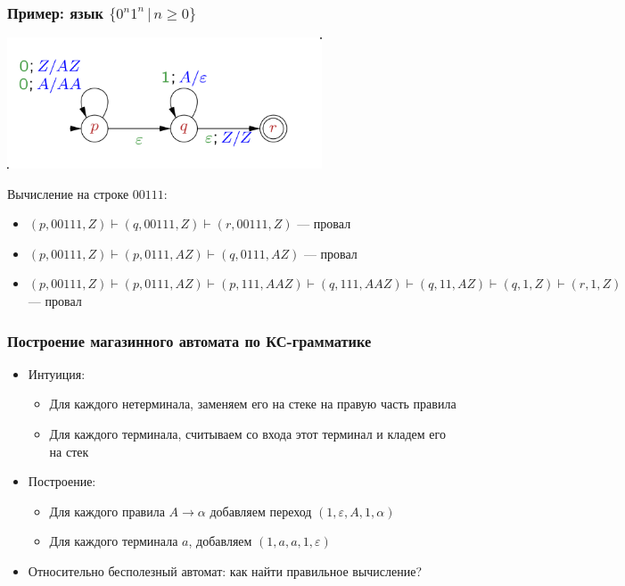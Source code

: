 \documentclass{beamer}
\begin{document}
\begin{frame}[fragile]
  \transwipe[direction=90]
  \frametitle{Пример: язык $\{ 0^n 1^n \, | \, n \geq 0 \}$}
\begin{center}
  \includegraphics[width=0.7\textwidth]{pics/Pda-example.png}
\end{center}

Вычисление на строке $00111$:
\begin{itemize}
  \item $(p, 00111, Z) \vdash (q, 00111, Z) \vdash (r, 00111, Z)$ --- провал
  \item $(p, 00111, Z) \vdash (p, 0111, AZ) \vdash (q, 0111, AZ)$ --- провал
  \item $(p, 00111, Z) \vdash (p, 0111, AZ) \vdash (p, 111, AAZ) \vdash (q, 111, AAZ) \vdash (q, 11, AZ) \vdash (q, 1, Z) \vdash (r, 1, Z)$ --- провал
\end{itemize}

\end{frame}


\begin{frame}[fragile]
  \transwipe[direction=90]
  \frametitle{Построение магазинного автомата по КС-грамматике}
  \begin{itemize}
    \item Интуиция:
    \begin{itemize}
      \item Для каждого нетерминала, заменяем его на стеке на правую часть правила
      \item Для каждого терминала, считываем со входа этот терминал и кладем его на стек
    \end{itemize}
    \item Построение:
    \begin{itemize}
      \item Для каждого правила $A \rightarrow \alpha$ добавляем переход $(1, \varepsilon, A, 1, \alpha)$
      \item Для каждого терминала $a$, добавляем $(1,a,a,1,\varepsilon)$
    \end{itemize}
    \item Относительно бесполезный автомат: как найти правильное вычисление?
  \end{itemize}
\end{frame}
\end{document}
